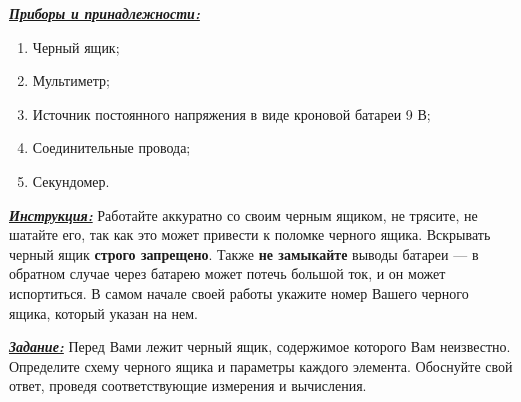 \problemsheader


\textbf{\uline{\textit{Приборы и принадлежности:}}}

\vspace*{6pt}

\begin{enumerate}[label=\textbf{\arabic*.}]
    \item Черный ящик;
    \item Мультиметр;
    \item Источник постоянного напряжения в виде кроновой батареи 9 В;
    \item Соединительные провода;
    \item Секундомер. 
\end{enumerate}

\vspace{10pt}

\textbf{\uline{\textit{Инструкция:}}} Работайте аккуратно со своим черным ящиком, не трясите, не шатайте его, так как это может привести к поломке черного ящика. Вскрывать черный ящик \textbf{строго запрещено}. Также \textbf{не замыкайте} выводы батареи --- в обратном случае через батарею может потечь большой ток, и он может испортиться. В самом начале своей работы укажите номер Вашего черного ящика, который указан на нем.

\vspace{10pt}

\textbf{\uline{\textit{Задание:}}} Перед Вами лежит черный ящик, содержимое которого Вам неизвестно. Определите схему черного ящика и параметры каждого элемента. Обоснуйте свой ответ, проведя соответствующие измерения и вычисления. 